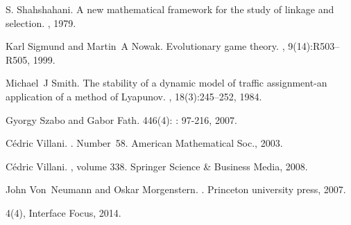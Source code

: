 \documentclass[11pt,reqno]{amsart}
\begin{document}
\begin{thebibliography}{10}
S. Shahshahani. 
\newblock A new mathematical framework for the study of linkage and selection.
, 1979.

Karl Sigmund and Martin~A Nowak.
\newblock Evolutionary game theory.
, 9(14):R503--R505, 1999.

Michael~J Smith.
\newblock The stability of a dynamic model of traffic assignment-an application of a method of Lyapunov.
, 18(3):245--252, 1984.

Gyorgy Szabo and Gabor Fath. 
 446(4): : 97-216, 2007.


C{\'e}dric Villani.
.
\newblock Number~58. American Mathematical Soc., 2003.

C{\'e}dric Villani.
, volume 338.
\newblock Springer Science \& Business Media, 2008.

John Von~Neumann and Oskar Morgenstern.
.
\newblock Princeton university press, 2007.

 4(4), Interface Focus, 2014.

\end{thebibliography}
\end{document}
